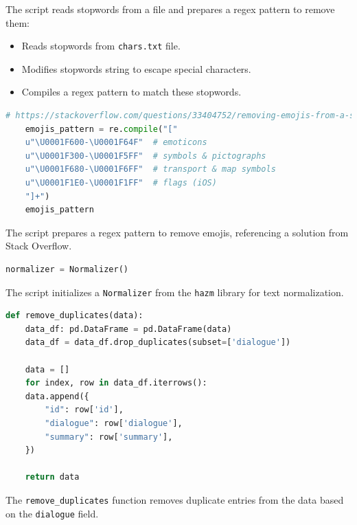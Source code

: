 \documentclass{solutionclass} %
\begin{document}
\begin{solution}
The script reads stopwords from a file and prepares a regex pattern to remove them:

\begin{itemize}
	\item Reads stopwords from \texttt{chars.txt} file.
	\item Modifies stopwords string to escape special characters.
	\item Compiles a regex pattern to match these stopwords.
\end{itemize}
\end{solution}


\begin{lstlisting}[language=Python]
	# https://stackoverflow.com/questions/33404752/removing-emojis-from-a-string-in-python
	emojis_pattern = re.compile("["
	u"\U0001F600-\U0001F64F"  # emoticons
	u"\U0001F300-\U0001F5FF"  # symbols & pictographs
	u"\U0001F680-\U0001F6FF"  # transport & map symbols
	u"\U0001F1E0-\U0001F1FF"  # flags (iOS)
	"]+")
	emojis_pattern
\end{lstlisting}


\begin{solution}
The script prepares a regex pattern to remove emojis, referencing a solution from Stack Overflow.
\end{solution}

\begin{lstlisting}[language=Python]
	normalizer = Normalizer()
\end{lstlisting}

\begin{solution}
The script initializes a \texttt{Normalizer} from the \texttt{hazm} library for text normalization.
\end{solution}


\begin{lstlisting}[language=Python]
	def remove_duplicates(data):
	data_df: pd.DataFrame = pd.DataFrame(data)
	data_df = data_df.drop_duplicates(subset=['dialogue'])
	
	data = []
	for index, row in data_df.iterrows():
	data.append({
		"id": row['id'],
		"dialogue": row['dialogue'],
		"summary": row['summary'],
	})
	
	return data
\end{lstlisting}


\begin{solution}
The \texttt{remove\_duplicates} function removes duplicate entries from the data based on the \texttt{dialogue} field.
\end{solution}
\end{document}
